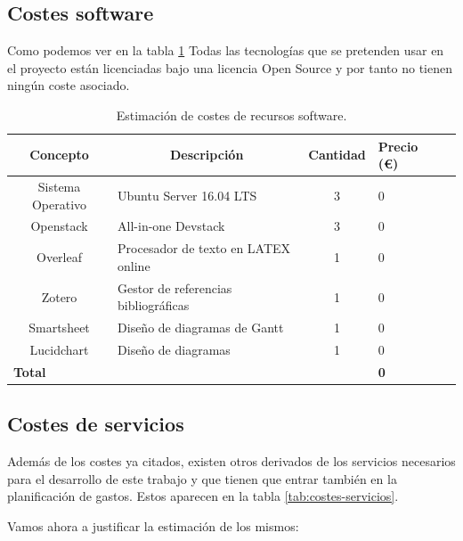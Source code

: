\subsection{Costes software}
Como podemos ver en la tabla \ref{tab:costes-software} Todas las tecnologías que se pretenden usar en el proyecto están licenciadas bajo una licencia Open Source y por tanto no tienen ningún coste asociado.

\renewcommand\arraystretch{1.1}
\begin{table}[!h]
\centering
\begin{adjustbox}{max width=\textwidth}
\begin{tabular}{|c|l|c|l|c|}
\hline
\textbf{Concepto} &  \multicolumn{1}{|c|}{\textbf{Descripción}} & \textbf{Cantidad}  & \textbf{Precio (\euro)}  \\
\hline \hline
Sistema Operativo & Ubuntu Server 16.04 LTS
  & 3 & 0 \\
\hline
Openstack & All-in-one Devstack & 3 & 0 \\
\hline
Overleaf & Procesador de texto en LATEX online & 1 & 0 \\
\hline
Zotero & Gestor de referencias bibliográficas & 1 & 0 \\
\hline
Smartsheet & Diseño de diagramas de Gantt & 1 & 0 \\
\hline
Lucidchart & Diseño de diagramas  & 1 & 0 \\
\hline
\multicolumn{3}{|l|}{\textbf{Total}} & \textbf{0} \\
\hline
\end{tabular}
\end{adjustbox}
\caption{Estimación de costes de recursos software.}
\label{tab:costes-software}
\end{table}

\subsection{Costes de servicios}
Además de los costes ya citados, existen otros derivados de los servicios necesarios para el desarrollo de este trabajo y que tienen que entrar también en la planificación de gastos. Estos aparecen en la tabla \ref{tab:costes-servicios}. 

Vamos ahora a justificar la estimación de los mismos:

